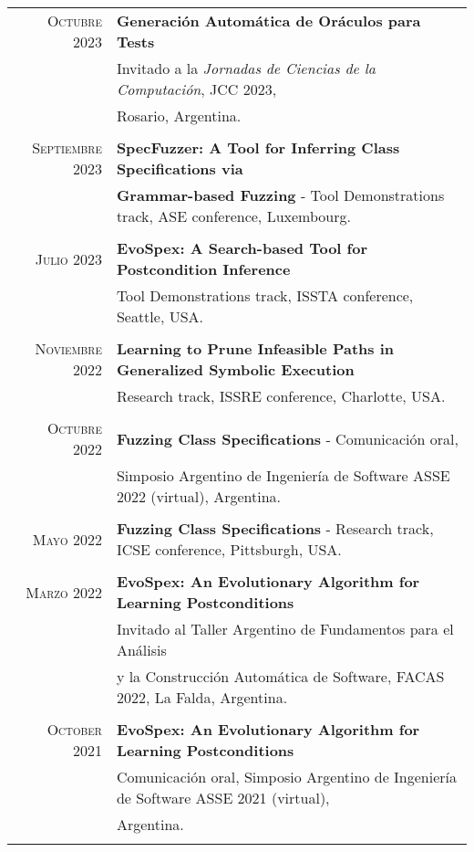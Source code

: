 \documentclass[a4paper,10pt]{article} %
\begin{document}
\begin{longtable}{rl}
\textsc{Octubre} 2023  & \textbf{Generación Automática de Oráculos para Tests} \\ 
& Invitado a la \textit{Jornadas de Ciencias de la Computación}, JCC 2023, \\ 
& Rosario, Argentina. \\ & \\

\textsc{Septiembre} 2023  & \textbf{SpecFuzzer: A Tool for Inferring Class Specifications via} \\ 
& \textbf{Grammar-based Fuzzing} - Tool Demonstrations track, ASE conference, Luxembourg. \\ & \\

\textsc{Julio} 2023 & \textbf{EvoSpex: A Search-based Tool for Postcondition Inference} \\ 
& Tool Demonstrations track, ISSTA conference, Seattle, USA. \\ & \\

\textsc{Noviembre} 2022 & \textbf{Learning to Prune Infeasible Paths in Generalized Symbolic Execution} \\
& Research track, ISSRE conference, Charlotte, USA. \\ & \\

\textsc{Octubre} 2022 & \textbf{Fuzzing Class Specifications} - Comunicación oral, \\ 
& Simposio Argentino de Ingeniería de Software ASSE 2022 (virtual), Argentina. \\ & \\

\textsc{Mayo} 2022 & \textbf{Fuzzing Class Specifications} - Research track, ICSE conference, Pittsburgh, USA. \\ & \\

\textsc{Marzo} 2022 & \textbf{EvoSpex: An Evolutionary Algorithm for Learning Postconditions} \\ 
& Invitado al Taller Argentino de Fundamentos para el Análisis\\ 
& y la Construcción Automática de Software, FACAS 2022, La Falda, Argentina. \\ & \\

\textsc{October} 2021 & \textbf{EvoSpex: An Evolutionary Algorithm for Learning Postconditions} \\ 
& Comunicación oral, Simposio Argentino de Ingeniería de Software ASSE 2021 (virtual), \\ 
& Argentina. \\ & \\


\end{longtable}
\end{document}
